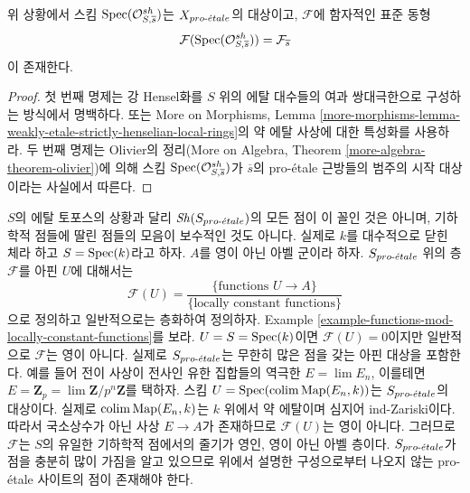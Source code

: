 \begin{lemma}
\label{lemma-classical-point}
위 상황에서 스킴 $\mathop{\mathrm{Spec}}(\mathcal{O}_{S, \overline{s}}^{sh})$는
$X_{pro\text{-}\acute{e}tale}$의 대상이고, $\mathcal{F}$에 함자적인 표준 동형
$$
\mathcal{F}(\mathop{\mathrm{Spec}}(\mathcal{O}_{S, \overline{s}}^{sh})) =
\mathcal{F}_{\overline{s}}
$$
이 존재한다.
\end{lemma}

\begin{proof}
첫 번째 명제는 강 Hensel화를 $S$ 위의 에탈 대수들의 여과 쌍대극한으로
구성하는 방식에서 명백하다. 또는 More on Morphisms, Lemma
\ref{more-morphisms-lemma-weakly-etale-strictly-henselian-local-rings}의
약 에탈 사상에 대한 특성화를 사용하라. 두 번째 명제는 Olivier의
정리(More on Algebra, Theorem \ref{more-algebra-theorem-olivier})에 의해
스킴 $\mathop{\mathrm{Spec}}(\mathcal{O}_{S, \overline{s}}^{sh})$가 $\overline{s}$의
pro-\'etale 근방들의 범주의 시작 대상이라는 사실에서 따른다.
\end{proof}

\noindent
$S$의 에탈 토포스의 상황과 달리 $\mathop{\mathit{Sh}}\nolimits(S_{pro\text{-}\acute{e}tale})$의 모든 점이 이
꼴인 것은 아니며, 기하학적 점들에 딸린 점들의 모음이 보수적인 것도
아니다. 실제로 $k$를 대수적으로 닫힌 체라 하고
$S = \mathop{\mathrm{Spec}}(k)$라고 하자. $A$를 영이 아닌 아벨 군이라 하자.
$S_{pro\text{-}\acute{e}tale}$ 위의 층 $\mathcal{F}$를 아핀 $U$에 대해서는
$$
\mathcal{F}(U) =
\frac{\{\text{functions }U \to A\}}{\{\text{locally constant functions}\}}
$$
으로 정의하고 일반적으로는 층화하여 정의하자. Example
\ref{example-functions-mod-locally-constant-functions}를 보라.
$U = S = \mathop{\mathrm{Spec}}(k)$이면 $\mathcal{F}(U) = 0$이지만 일반적으로
$\mathcal{F}$는 영이 아니다. 실제로 $S_{pro\text{-}\acute{e}tale}$는 무한히 많은
점을 갖는 아핀 대상을 포함한다. 예를 들어 전이 사상이 전사인 유한
집합들의 역극한 $E = \lim E_n$, 이를테면
$E = \mathbf{Z}_p = \lim \mathbf{Z}/p^n\mathbf{Z}$를 택하자.
스킴 $U = \mathop{\mathrm{Spec}}(\mathop{\mathrm{colim}}\nolimits \text{Map}(E_n, k))$는 $S_{pro\text{-}\acute{e}tale}$의 대상이다.
실제로 $\mathop{\mathrm{colim}}\nolimits \text{Map}(E_n, k)$는 $k$ 위에서 약 에탈이며 심지어
ind-Zariski이다. 따라서 국소상수가 아닌 사상 $E \to A$가 존재하므로
$\mathcal{F}(U)$는 영이 아니다. 그러므로 $\mathcal{F}$는 $S$의
유일한 기하학적 점에서의 줄기가 영인, 영이 아닌 아벨 층이다.
$S_{pro\text{-}\acute{e}tale}$가 점을 충분히 많이 가짐을 알고 있으므로 위에서 설명한
구성으로부터 나오지 않는 pro-\'etale 사이트의 점이 존재해야 한다.

